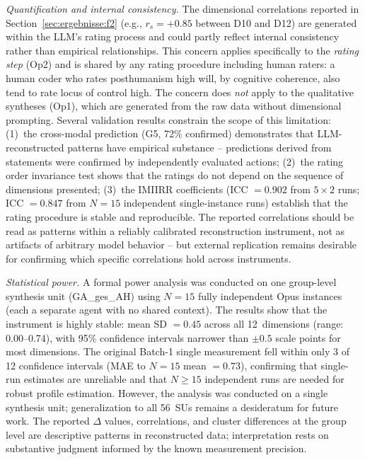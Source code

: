 \documentclass[12pt,a4paper]{article}
\begin{document}
\emph{Quantification and internal consistency.} The dimensional correlations reported in Section~\ref{sec:ergebnisse:f2} (e.g., $r_s = +0.85$ between D10 and D12) are generated within the LLM's rating process and could partly reflect internal consistency rather than empirical relationships. This concern applies specifically to the \emph{rating step} (Op2) and is shared by any rating procedure including human raters: a human coder who rates posthumanism high will, by cognitive coherence, also tend to rate locus of control high. The concern does \emph{not} apply to the qualitative syntheses (Op1), which are generated from the raw data without dimensional prompting. Several validation results constrain the scope of this limitation: (1)~the cross-modal prediction (G5, 72\% confirmed) demonstrates that LLM-reconstructed patterns have empirical substance -- predictions derived from statements were confirmed by independently evaluated actions; (2)~the rating order invariance test shows that the ratings do not depend on the sequence of dimensions presented; (3)~the IMIIRR coefficients (ICC $= 0.902$ from $5 \times 2$ runs; ICC $= 0.847$ from $N = 15$ independent single-instance runs) establish that the rating procedure is stable and reproducible. The reported correlations should be read as patterns within a reliably calibrated reconstruction instrument, not as artifacts of arbitrary model behavior -- but external replication remains desirable for confirming which specific correlations hold across instruments.

\emph{Statistical power.} A formal power analysis was conducted on one group-level synthesis unit (GA\_ges\_AH) using $N = 15$ fully independent Opus instances (each a separate agent with no shared context). The results show that the instrument is highly stable: mean SD $= 0.45$ across all 12~dimensions (range: 0.00--0.74), with 95\% confidence intervals narrower than $\pm 0.5$ scale points for most dimensions. The original Batch-1 single measurement fell within only 3 of 12 confidence intervals (MAE to $N = 15$ mean $= 0.73$), confirming that single-run estimates are unreliable and that $N \geq 15$ independent runs are needed for robust profile estimation. However, the analysis was conducted on a single synthesis unit; generalization to all 56~SUs remains a desideratum for future work. The reported $\Delta$ values, correlations, and cluster differences at the group level are descriptive patterns in reconstructed data; interpretation rests on substantive judgment informed by the known measurement precision.
\end{document}
